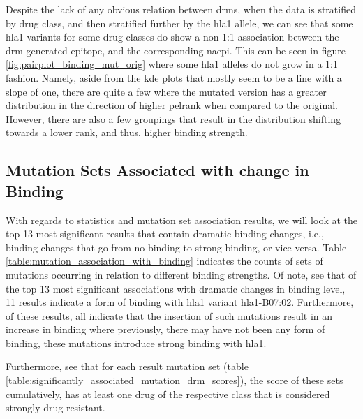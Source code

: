 Despite the lack of any obvious relation between \acp{drm}, when the data is stratified by drug class, and then stratified further by the \ac{hla1} allele, we can see that some \ac{hla1} variants for some drug classes do show a non 1:1 association between the \ac{drm} generated epitope, and the corresponding \ac{naepi}. This can be seen in figure \ref{fig:pairplot_binding_mut_orig} where some \ac{hla1} alleles do not grow in a 1:1 fashion. Namely, aside from the \ac{kde} plots that mostly seem to be a line with a slope of one, there are quite a few where the mutated version has a greater distribution in the direction of higher \ac{pelrank} when compared to the original. However, there are also a few groupings that result in the distribution shifting towards a lower rank, and thus, higher binding strength.



\subsection{Mutation Sets Associated with change in Binding}



With regards to statistics and mutation set association results, we will look at the top 13 most significant results that contain dramatic binding changes, i.e., binding changes that go from no binding to strong binding, or vice versa. Table \ref{table:mutation_association_with_binding} indicates the counts of sets of mutations occurring in relation to different binding strengths. Of note, see that of the top 13 most significant associations with dramatic changes in binding level, 11 results indicate a form of binding with \ac{hla1} variant \acs{hla1}-B07:02. Furthermore, of these results, all indicate that the insertion of such mutations result in an increase in binding where previously, there may have not been any form of binding, these mutations introduce strong binding with \ac{hla1}.



Furthermore, see that for each result mutation set (table \ref{table:significantly_associated_mutation_drm_scores}), the score of these sets cumulatively, has at least one drug of the respective class that is considered strongly drug resistant.